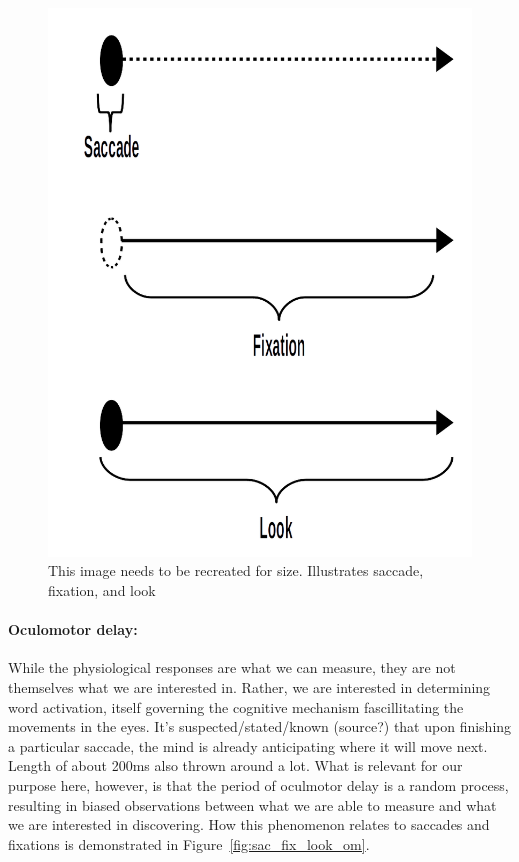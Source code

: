 \documentclass{article}
\begin{document}
\begin{figure}
\centering
\includegraphics[scale=0.25]{sac_fix_look.png}
\caption{This image needs to be recreated for size. Illustrates saccade, fixation, and look}
\label{fig:sac_fix_look}
\end{figure}

\paragraph{Oculomotor delay:} While the physiological responses are what we can measure, they are not themselves what we are interested in. Rather, we are interested in determining word activation, itself governing the cognitive mechanism fascillitating the movements in the eyes. It's suspected/stated/known (source?) that upon finishing a particular saccade, the mind is already anticipating where it will move next. Length of about 200ms also thrown around a lot. What is relevant for our purpose here, however, is that the period of oculmotor delay is a random process, resulting in biased observations between what we are able to measure and what we are interested in discovering. How this phenomenon relates to saccades and fixations is demonstrated in Figure~\ref{fig:sac_fix_look_om}.
\end{document}
